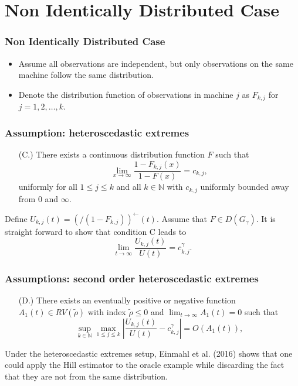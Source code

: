 \documentclass{beamer}
\newcommand{\suit}[1]{\left(#1\right)}
\begin{document}
\section{Non Identically Distributed Case}

\begin{frame}
    \frametitle{Non Identically Distributed Case }
\begin{itemize}
    \item Assume all observations are
    independent, but only observations on the same machine follow the same distribution.
    \bigskip
    \item Denote the distribution function of observations in machine $j$ as $F_{k,j}$ for $j=1,2,\dots,k$.
\end{itemize}
\end{frame}


\begin{frame}
    \frametitle{Assumption: heteroscedastic extremes}
\begin{itemize}
    \item[(C.)] There exists a continuous distribution function $F$ such that 
    $$
        \lim_{x\to \infty}\dfrac{1-F_{k,j}(x)}{1-F(x)}=c_{k,j},
    $$
        uniformly for  all $1\le j \le k$ and all $k \in \mathbb{N}$ with $c_{k,j}$ uniformly bounded away from $0$ and $\infty$.  
\end{itemize}
Define $U_{k,j}(t)=\left( /\suit{1-F_{k,j}}\right)^{\leftarrow}(t).$ Assume that $F\in D(G_{\gamma})$. It is straight forward to show that condition C leads to 
$$
\lim _{t \rightarrow \infty} \frac{U_{k, j}(t )}{U(t)}=c_{k,j}^{\gamma}.
$$

\end{frame}


\begin{frame}
    \frametitle{Assumptions: second order  heteroscedastic extremes}

    
    \begin{itemize}
        \item[(D.)] There exists an eventually positive or negative function $A_1(t)\in RV(\tilde{\rho})$ with index $\tilde{\rho}\le 0$ and  $\lim_{t\to \infty} A_1(t)=0$  such that
        $$
        \sup_{k\in \mathbb{N}}\max_{1\le j\le k}\left|\dfrac{U_{k,j}(t)}{U(t)}-c_{k,j}^{\gamma} \right|=O\left(A_1(t)\right),
        $$ 
    \end{itemize}
    Under the heteroscedastic extremes setup, Einmahl et al. (2016) shows that one could apply the Hill estimator to the oracle example while
    discarding the fact that they are not from the same distribution.
\end{frame}
\end{document}
